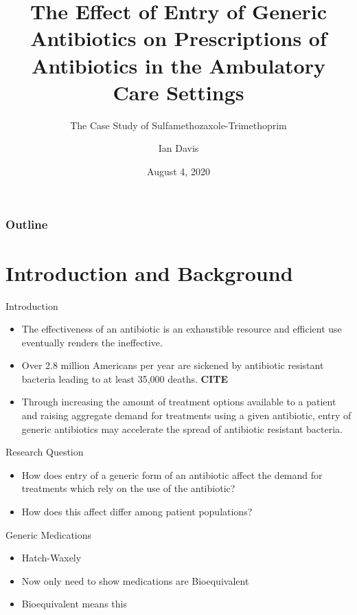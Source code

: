 \documentclass{beamer}
\title{The Effect of Entry of Generic Antibiotics on Prescriptions of Antibiotics in the Ambulatory Care Settings}
\subtitle{The Case Study of Sulfamethozaxole-Trimethoprim}
\author{Ian Davis}
\institute{Clemson University}
\date{August 4, 2020}
\begin{document}
\begin{frame}
\titlepage
\end{frame}

\begin{frame}
\frametitle{Outline}
\tableofcontents
\end{frame}

\section{Introduction and Background}
\begin{frame}{Introduction}
\begin{itemize}
\item The effectiveness of an antibiotic is an exhaustible resource and efficient use eventually renders the ineffective.
\item Over 2.8 million Americans per year are sickened by antibiotic resistant bacteria leading to at least 35,000 deaths. \textbf{CITE}
\item Through increasing the amount of treatment options available to a patient and raising aggregate demand for treatments using a given antibiotic, entry of generic antibiotics may accelerate the spread of antibiotic resistant bacteria.
\end{itemize}
\end{frame}

\begin{frame}{Research Question}
\begin{itemize}
\item How does entry of a generic form of an antibiotic affect the demand for treatments which rely on the use of the antibiotic? 
\item How does this affect differ among patient populations?
\end{itemize}
\end{frame}

\begin{frame}{Generic Medications}
\begin{itemize}
\item Hatch-Waxely
\item Now only need to show medications are Bioequivalent
\item Bioequivalent means this
\end{itemize}
\end{frame}
\end{document}
